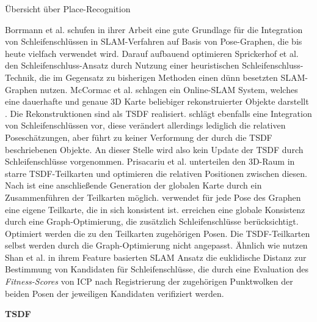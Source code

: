 \begin{description}
\item
Übersicht über Place-Recognition
\end{description}

Borrmann et al. \cite{borrmann2008globally} schufen in ihrer Arbeit eine gute Grundlage für die Integration von Schleifenschlüssen in SLAM-Verfahren auf Basis von Pose-Graphen, die bis heute vielfach verwendet wird. Darauf aufbauend optimieren Sprickerhof et al. \cite{sprickerhof2011heuristic} den Schleifenschluss-Ansatz durch Nutzung einer heuristischen Schleifenschluss-Technik, die im Gegensatz zu bisherigen Methoden einen dünn besetzten SLAM-Graphen nutzen.
McCormac et al. \cite{mccormac2018fusion++} schlagen ein Online-SLAM System, welches eine dauerhafte und genaue 3D Karte beliebiger rekonstruierter Objekte darstellt \cite{mccormac2018fusion++}. Die Rekonstruktionen sind als TSDF realisiert. \cite{mccormac2018fusion++} schlägt ebenfalls eine Integration von Schleifenschlüssen vor, diese verändert allerdings lediglich die relativen Poseschätzungen, aber führt zu keiner Verformung der durch die TSDF beschriebenen Objekte. An dieser Stelle wird also kein Update der TSDF durch Schleifenschlüsse vorgenommen.
Prisacariu et al. \cite{prisacariu2017infinitam} unterteilen den 3D-Raum in starre TSDF-Teilkarten und optimieren die relativen Positionen zwischen diesen. Nach \cite{prisacariu2017infinitam} ist eine anschließende Generation der globalen Karte durch ein Zusammenführen der Teilkarten möglich. \cite{prisacariu2017infinitam} verwendet für jede Pose des Graphen eine eigene Teilkarte, die in sich konsistent ist. \cite{prisacariu2017infinitam} erreichen eine globale Konsistenz durch eine Graph-Optimierung, die zusätzlich Schleifenschlüsse berücksichtigt. Optimiert werden die zu den Teilkarten zugehörigen Posen. Die TSDF-Teilkarten selbst werden durch die Graph-Optimierung nicht angepasst.
Ähnlich wie \cite{borrmann2008globally} nutzen Shan et al. \cite{shan2020lio} in ihrem Feature basierten SLAM Ansatz die euklidische Distanz zur Bestimmung von Kandidaten für Schleifenschlüsse, die durch eine Evaluation des \emph{Fitness-Scores} von ICP nach Registrierung der zugehörigen Punktwolken der beiden Posen der jeweiligen Kandidaten verifiziert werden.

\textbf{TSDF}

